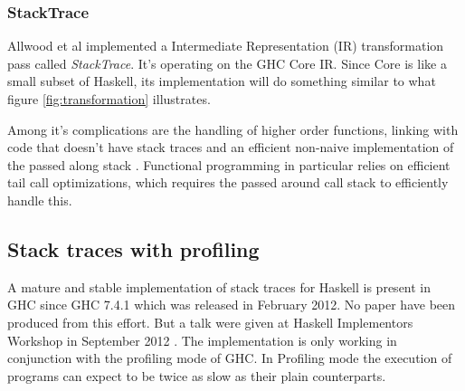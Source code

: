 \subsubsection{StackTrace}

Allwood et al implemented a Intermediate Representation (IR) transformation
pass called \emph{StackTrace}. It's operating on the GHC Core IR. Since
Core is like a small subset of Haskell, its implementation will do
something similar to what figure \ref{fig:transformation} illustrates.

Among it's complications are the
handling of higher order functions, linking with code that doesn't have stack
traces and an efficient non-naive implementation of the
passed along stack \cite{FindingTheNeedle2009}.
Functional programming in particular relies on efficient tail call
optimizations, which
requires the passed around call stack to efficiently handle this.



\subsection{Stack traces with profiling} \label{sec:stack_traces_with_profiling}

A mature and stable implementation of stack traces for
Haskell is present in GHC since GHC 7.4.1 which was released in February
2012. No paper have been produced from this effort. But a talk were
given at Haskell Implementors Workshop in September 2012 \cite{HIW2012Programme}.
The implementation is only working in conjunction with the profiling
mode of GHC. In Profiling mode the execution of programs can expect to
be twice as slow as their plain counterparts.

